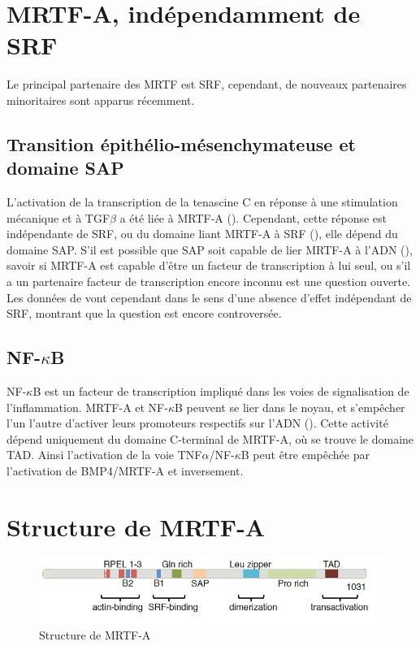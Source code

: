 \section{MRTF-A, indépendamment de SRF}

Le principal partenaire des MRTF est SRF, cependant, de nouveaux partenaires minoritaires sont apparus récemment. 

\subsection{Transition épithélio-mésenchymateuse et domaine SAP}

L'activation de la transcription de la tenascine C en réponse à une stimulation mécanique et à TGF$\beta$ a été liée à MRTF-A (\cite{maier_tenascin-c_2008}). Cependant, cette réponse est indépendante de SRF, ou du domaine liant MRTF-A à SRF (\cite{asparuhova_transcriptional_2011}), elle dépend du domaine SAP. 
S'il est possible que SAP soit capable de lier MRTF-A à l'ADN (\cite{aravind_sapputative_2000}), savoir si MRTF-A est capable d'être un facteur de transcription à lui seul, ou s'il a un partenaire facteur de transcription encore inconnu est une question ouverte. Les données de  \cite{esnault_rho-actin_2014} vont cependant dans le sens d'une absence d'effet indépendant de SRF, montrant que la question est encore controversée. 


\subsection{NF-$\kappa$B}

NF-$\kappa$B est un facteur de transcription impliqué dans les voies de signalisation de l'inflammation. MRTF-A et NF-$\kappa$B peuvent se lier dans le noyau, et s'empêcher l'un l'autre d'activer leurs promoteurs respectifs sur l'ADN (\cite{wang_bone_2012}). 
Cette activité dépend uniquement du domaine C-terminal de MRTF-A, où se trouve le domaine TAD. 
Ainsi l'activation de la voie TNF$\alpha$/NF-$\kappa$B peut être empêchée par l'activation de BMP4/MRTF-A et inversement. 

\section{Structure de MRTF-A}

\begin{figure}[h!]
\center
\includegraphics[scale=0.5]{MRTFA_structure.png}
\caption{Structure de MRTF-A \parencite{scharenberg_tgf-_2014}}
\end{figure}
